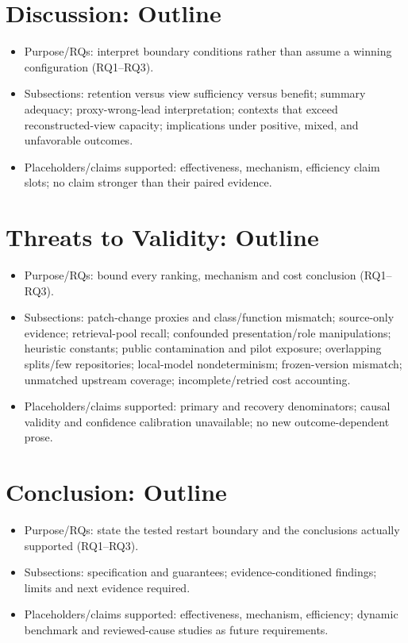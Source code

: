 \documentclass[letterpaper,journal]{IEEEtran}
\begin{document}
\section{Discussion: Outline}
\begin{itemize}
\item Purpose/RQs: interpret boundary conditions rather than assume a winning configuration (RQ1--RQ3).
\item Subsections: retention versus view sufficiency versus benefit; summary adequacy; proxy-wrong-lead interpretation; contexts that exceed reconstructed-view capacity; implications under positive, mixed, and unfavorable outcomes.
\item Placeholders/claims supported: effectiveness, mechanism, efficiency claim slots; no claim stronger than their paired evidence.
\end{itemize}

\section{Threats to Validity: Outline}
\begin{itemize}
\item Purpose/RQs: bound every ranking, mechanism and cost conclusion (RQ1--RQ3).
\item Subsections: patch-change proxies and class/function mismatch; source-only evidence; retrieval-pool recall; confounded presentation/role manipulations; heuristic constants; public contamination and pilot exposure; overlapping splits/few repositories; local-model nondeterminism; frozen-version mismatch; unmatched upstream coverage; incomplete/retried cost accounting.
\item Placeholders/claims supported: primary and recovery denominators; causal validity and confidence calibration unavailable; no new outcome-dependent prose.
\end{itemize}

\section{Conclusion: Outline}
\begin{itemize}
\item Purpose/RQs: state the tested restart boundary and the conclusions actually supported (RQ1--RQ3).
\item Subsections: specification and guarantees; evidence-conditioned findings; limits and next evidence required.
\item Placeholders/claims supported: effectiveness, mechanism, efficiency; dynamic benchmark and reviewed-cause studies as future requirements.
\end{itemize}
\end{document}
